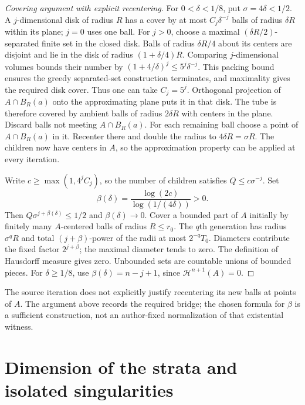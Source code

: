 \documentclass[11pt,a4paper]{article}
\numberwithin{equation}{section}
\theoremstyle{definition}
\theoremstyle{remark}
\newcommand{\HH}{\mathcal H}
\begin{document}
\begin{proof}[Covering argument with explicit recentering]
For $0<\delta<1/8$, put $\sigma=4\delta<1/2$.
A $j$-dimensional disk of radius $R$ has a cover by at most
$C_j\delta^{-j}$ balls of radius $\delta R$ within its plane; $j=0$
uses one ball.
\label{step:disk-net}
For $j>0$, choose a maximal $(\delta R/2)$-separated finite set in the
closed disk. Balls of radius $\delta R/4$ about its centers are disjoint
and lie in the disk of radius $(1+\delta/4)R$. Comparing $j$-dimensional
volumes bounds their number by $(1+4/\delta)^j\le5^j\delta^{-j}$.
This packing bound ensures the greedy separated-set construction
terminates, and maximality gives the required disk cover. Thus one can
take $C_j=5^j$. Orthogonal projection of $A\cap B_R(a)$ onto the
approximating plane puts it in that disk. The tube is therefore covered
by ambient balls of radius $2\delta R$ with centers in the plane.
Discard balls not meeting $A\cap B_R(a)$. For each remaining ball
choose a point of $A\cap B_R(a)$ in it. Recenter there and double the
radius to $4\delta R=\sigma R$. The children now have centers in $A$,
so the approximation property can be applied at every iteration.

Write $c\ge\max(1,4^jC_j)$, so the number of children satisfies
$Q\le c\sigma^{-j}$. Set
\begin{equation}\label{eq:beta}
 \beta(\delta)=\frac{\log(2c)}{\log(1/(4\delta))}>0.
\end{equation}
Then $Q\sigma^{j+\beta(\delta)}\le1/2$ and $\beta(\delta)\to0$.
Cover a bounded part of $A$ initially by finitely many $A$-centered
balls of radius $R\le r_0$. The $q$th generation has radius $\sigma^qR$
and total $(j+\beta)$-power of the radii at most $2^{-q}T_0$.
Diameters contribute the fixed factor $2^{j+\beta}$; the maximal
diameter tends to zero. The definition of Hausdorff measure gives zero.
Unbounded sets are countable unions of bounded pieces. For
$\delta\ge1/8$, use $\beta(\delta)=n-j+1$, since $\HH^{n+1}(A)=0$.
\end{proof}
The source iteration does not explicitly justify recentering its new
balls at points of $A$. The argument above records the required bridge;
the chosen formula for $\beta$ is a sufficient construction, not an
author-fixed normalization of that existential witness.

\section{Dimension of the strata and isolated singularities}
\end{document}
